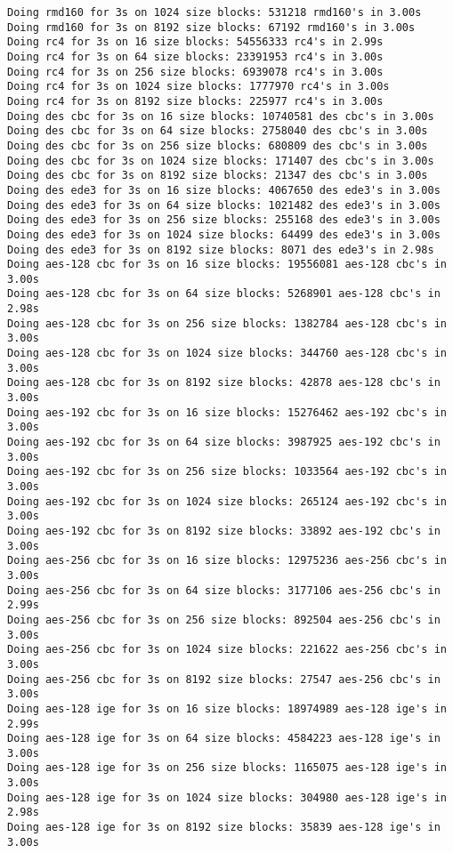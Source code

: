 \documentclass[a4paper,11pt]{article}
\theoremstyle{mytheor}
\begin{document}
\begin{lstlisting}
Doing rmd160 for 3s on 1024 size blocks: 531218 rmd160's in 3.00s
Doing rmd160 for 3s on 8192 size blocks: 67192 rmd160's in 3.00s
Doing rc4 for 3s on 16 size blocks: 54556333 rc4's in 2.99s
Doing rc4 for 3s on 64 size blocks: 23391953 rc4's in 3.00s
Doing rc4 for 3s on 256 size blocks: 6939078 rc4's in 3.00s
Doing rc4 for 3s on 1024 size blocks: 1777970 rc4's in 3.00s
Doing rc4 for 3s on 8192 size blocks: 225977 rc4's in 3.00s
Doing des cbc for 3s on 16 size blocks: 10740581 des cbc's in 3.00s
Doing des cbc for 3s on 64 size blocks: 2758040 des cbc's in 3.00s
Doing des cbc for 3s on 256 size blocks: 680809 des cbc's in 3.00s
Doing des cbc for 3s on 1024 size blocks: 171407 des cbc's in 3.00s
Doing des cbc for 3s on 8192 size blocks: 21347 des cbc's in 3.00s
Doing des ede3 for 3s on 16 size blocks: 4067650 des ede3's in 3.00s
Doing des ede3 for 3s on 64 size blocks: 1021482 des ede3's in 3.00s
Doing des ede3 for 3s on 256 size blocks: 255168 des ede3's in 3.00s
Doing des ede3 for 3s on 1024 size blocks: 64499 des ede3's in 3.00s
Doing des ede3 for 3s on 8192 size blocks: 8071 des ede3's in 2.98s
Doing aes-128 cbc for 3s on 16 size blocks: 19556081 aes-128 cbc's in 3.00s
Doing aes-128 cbc for 3s on 64 size blocks: 5268901 aes-128 cbc's in 2.98s
Doing aes-128 cbc for 3s on 256 size blocks: 1382784 aes-128 cbc's in 3.00s
Doing aes-128 cbc for 3s on 1024 size blocks: 344760 aes-128 cbc's in 3.00s
Doing aes-128 cbc for 3s on 8192 size blocks: 42878 aes-128 cbc's in 3.00s
Doing aes-192 cbc for 3s on 16 size blocks: 15276462 aes-192 cbc's in 3.00s
Doing aes-192 cbc for 3s on 64 size blocks: 3987925 aes-192 cbc's in 3.00s
Doing aes-192 cbc for 3s on 256 size blocks: 1033564 aes-192 cbc's in 3.00s
Doing aes-192 cbc for 3s on 1024 size blocks: 265124 aes-192 cbc's in 3.00s
Doing aes-192 cbc for 3s on 8192 size blocks: 33892 aes-192 cbc's in 3.00s
Doing aes-256 cbc for 3s on 16 size blocks: 12975236 aes-256 cbc's in 3.00s
Doing aes-256 cbc for 3s on 64 size blocks: 3177106 aes-256 cbc's in 2.99s
Doing aes-256 cbc for 3s on 256 size blocks: 892504 aes-256 cbc's in 3.00s
Doing aes-256 cbc for 3s on 1024 size blocks: 221622 aes-256 cbc's in 3.00s
Doing aes-256 cbc for 3s on 8192 size blocks: 27547 aes-256 cbc's in 3.00s
Doing aes-128 ige for 3s on 16 size blocks: 18974989 aes-128 ige's in 2.99s
Doing aes-128 ige for 3s on 64 size blocks: 4584223 aes-128 ige's in 3.00s
Doing aes-128 ige for 3s on 256 size blocks: 1165075 aes-128 ige's in 3.00s
Doing aes-128 ige for 3s on 1024 size blocks: 304980 aes-128 ige's in 2.98s
Doing aes-128 ige for 3s on 8192 size blocks: 35839 aes-128 ige's in 3.00s

\end{lstlisting}
\end{document}
